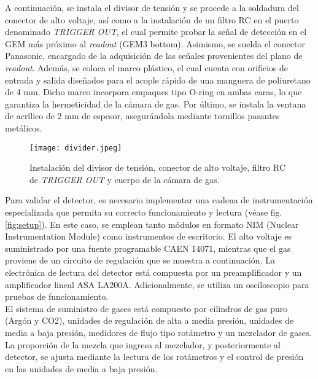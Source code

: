 \documentclass{report}
\begin{document}
\noindent A continuación, se instala el divisor de tensión y se procede a la soldadura del conector de alto voltaje, así como a la instalación de un filtro RC en el puerto denominado \textit{TRIGGER OUT}, el cual permite probar la señal de detección en el GEM más próximo al \textit{readout} (GEM3 bottom). Asimismo, se suelda el conector Panasonic, encargado de la adquisición de las señales provenientes del plano de \textit{readout}. Además, se coloca el marco plástico, el cual cuenta con orificios de entrada y salida diseñados para el acople rápido de una manguera de poliuretano de 4 mm. Dicho marco incorpora empaques tipo O-ring en ambas caras, lo que garantiza la hermeticidad de la cámara de gas. Por último, se instala la ventana de acrílico de 2 mm de espesor, asegurándola mediante tornillos pasantes metálicos.\\

\begin{figure}[H]
    \centering
    \texttt{[image: divider.jpeg]}
    \caption{Instalación del divisor de tensión, conector de alto voltaje, filtro RC de \textit{TRIGGER OUT} y cuerpo de la cámara de gas.}
    \label{fig:divider}
\end{figure}

\noindent 

\noindent Para validar el detector, es necesario implementar una cadena de instrumentación especializada que permita su correcto funcionamiento y lectura (véase fig. \ref{fig:setup}). En este caso, se emplean tanto módulos en formato NIM (Nuclear Instrumentation Module) como instrumentos de escritorio. El alto voltaje es suministrado por una fuente programable CAEN 14071, mientras que el gas proviene de un circuito de regulación que se muestra a continuación. La electrónica de lectura del detector está compuesta por un preamplificador y un amplificador lineal ASA LA200A. Adicionalmente, se utiliza un osciloscopio para pruebas de funcionamiento.\\

\noindent El sistema de suministro de gases está compuesto por cilindros de gas puro (Argón y CO2), unidades de regulación de alta a media presión, unidades de media a baja presión, medidores de flujo tipo rotámetro y un mezclador de gases. La proporción de la mezcla que ingresa al mezclador, y posteriormente al detector, se ajusta mediante la lectura de los rotámetros y el control de presión en las unidades de media a baja presión.\\
\end{document}
